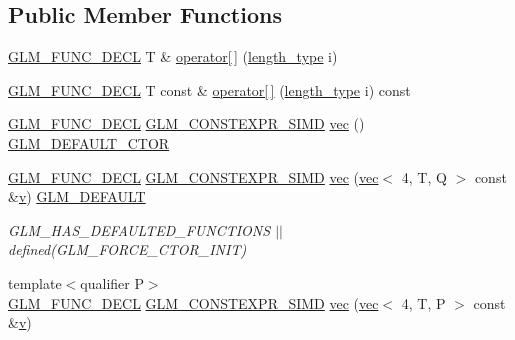 \subsection*{Public Member Functions}
\begin{DoxyCompactItemize}
\item 
\hyperlink{setup_8hpp_ab2d052de21a70539923e9bcbf6e83a51}{G\+L\+M\+\_\+\+F\+U\+N\+C\+\_\+\+D\+E\+CL} T \& \hyperlink{structglm_1_1vec_3_014_00_01_t_00_01_q_01_4_a49fc7a64b8898f20a4f223a41c97eaef}{operator\mbox{[}$\,$\mbox{]}} (\hyperlink{structglm_1_1vec_3_014_00_01_t_00_01_q_01_4_af1c8f56963141951f4a4724b47e072d9}{length\+\_\+type} i)
\item 
\hyperlink{setup_8hpp_ab2d052de21a70539923e9bcbf6e83a51}{G\+L\+M\+\_\+\+F\+U\+N\+C\+\_\+\+D\+E\+CL} T const  \& \hyperlink{structglm_1_1vec_3_014_00_01_t_00_01_q_01_4_adea890cef20b856644085cc9fb20a2a2}{operator\mbox{[}$\,$\mbox{]}} (\hyperlink{structglm_1_1vec_3_014_00_01_t_00_01_q_01_4_af1c8f56963141951f4a4724b47e072d9}{length\+\_\+type} i) const
\item 
\hyperlink{setup_8hpp_ab2d052de21a70539923e9bcbf6e83a51}{G\+L\+M\+\_\+\+F\+U\+N\+C\+\_\+\+D\+E\+CL} \hyperlink{setup_8hpp_ae5de828d10226b21e2123dd61f3cb5ed}{G\+L\+M\+\_\+\+C\+O\+N\+S\+T\+E\+X\+P\+R\+\_\+\+S\+I\+MD} \hyperlink{structglm_1_1vec_3_014_00_01_t_00_01_q_01_4_a7ab4da90825b52bb9a7ef01268ac4d54}{vec} () \hyperlink{setup_8hpp_afb97a4e995bc004c0cbbfa22125b80ba}{G\+L\+M\+\_\+\+D\+E\+F\+A\+U\+L\+T\+\_\+\+C\+T\+OR}
\item 
\hyperlink{setup_8hpp_ab2d052de21a70539923e9bcbf6e83a51}{G\+L\+M\+\_\+\+F\+U\+N\+C\+\_\+\+D\+E\+CL} \hyperlink{setup_8hpp_ae5de828d10226b21e2123dd61f3cb5ed}{G\+L\+M\+\_\+\+C\+O\+N\+S\+T\+E\+X\+P\+R\+\_\+\+S\+I\+MD} \hyperlink{structglm_1_1vec_3_014_00_01_t_00_01_q_01_4_ad218b24398db0a16b0df3a0e64f6f638}{vec} (\hyperlink{structglm_1_1vec}{vec}$<$ 4, T, Q $>$ const \&\hyperlink{_s_d_l__opengl_8h_a10a82eabcb59d2fcd74acee063775f90}{v}) \hyperlink{setup_8hpp_aefce7051c376a64ba89fa93a9f63bc2c}{G\+L\+M\+\_\+\+D\+E\+F\+A\+U\+LT}
\begin{DoxyCompactList}\small\item\em G\+L\+M\+\_\+\+H\+A\+S\+\_\+\+D\+E\+F\+A\+U\+L\+T\+E\+D\+\_\+\+F\+U\+N\+C\+T\+I\+O\+NS $\vert$$\vert$ defined(\+G\+L\+M\+\_\+\+F\+O\+R\+C\+E\+\_\+\+C\+T\+O\+R\+\_\+\+I\+N\+I\+T) \end{DoxyCompactList}\item 
{\footnotesize template$<$qualifier P$>$ }\\\hyperlink{setup_8hpp_ab2d052de21a70539923e9bcbf6e83a51}{G\+L\+M\+\_\+\+F\+U\+N\+C\+\_\+\+D\+E\+CL} \hyperlink{setup_8hpp_ae5de828d10226b21e2123dd61f3cb5ed}{G\+L\+M\+\_\+\+C\+O\+N\+S\+T\+E\+X\+P\+R\+\_\+\+S\+I\+MD} \hyperlink{structglm_1_1vec_3_014_00_01_t_00_01_q_01_4_a7f8d760e50fc7fb597c88ee4bf5bbcc2}{vec} (\hyperlink{structglm_1_1vec}{vec}$<$ 4, T, P $>$ const \&\hyperlink{_s_d_l__opengl_8h_a10a82eabcb59d2fcd74acee063775f90}{v})

\end{DoxyCompactItemize}
